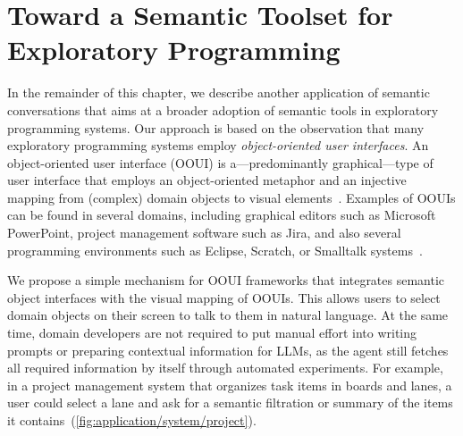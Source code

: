 
\section{Toward a Semantic Toolset for Exploratory Programming}
\label{sec:application/system}

In the remainder of this chapter, we describe another application of semantic conversations that aims at a broader adoption of semantic tools in exploratory programming systems.
Our approach is based on the observation that many exploratory programming systems employ \emph{object-oriented user interfaces}.
An object-oriented user interface (OOUI) is a---predominantly graphical---type of user interface that employs an object-oriented metaphor and an injective mapping from (complex) domain objects to visual elements~\cite{collins1995designing}.
Examples of OOUIs can be found in several domains, including graphical editors such as Microsoft PowerPoint, project management software such as Jira, and also several programming environments such as Eclipse, Scratch, or Smalltalk systems~\cite{pawson2001naked}.

We propose a simple mechanism for OOUI frameworks that integrates semantic object interfaces with the visual mapping of OOUIs.
This allows users to select domain objects on their screen to talk to them in natural language.
At the same time, domain developers are not required to put manual effort into writing prompts or preparing contextual information for LLMs, as the agent still fetches all required information by itself through automated experiments.
For example, in a project management system that organizes task items in boards and lanes, a user could select a lane and ask for a semantic filtration or summary of the items it contains~(\cref{fig:application/system/project}).

